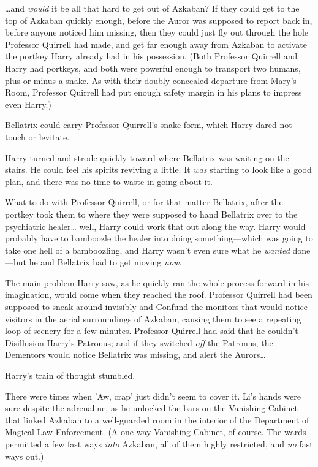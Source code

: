 {\ldots}and \emph{would} it be all that hard to get out of Azkaban? If they 
could get to the top of Azkaban quickly enough, before the Auror was supposed 
to report back in, before anyone noticed him missing, then they could just fly 
out through the hole Professor Quirrell had made, and get far enough away from 
Azkaban to activate the portkey Harry already had in his possession. (Both 
Professor Quirrell and Harry had portkeys, and both were powerful enough to 
transport two humans, plus or minus a snake. As with their doubly-concealed 
departure from Mary's Room, Professor Quirrell had put enough safety margin in 
his plans to impress even Harry.)

Bellatrix could carry Professor Quirrell's snake form, which Harry dared not 
touch or levitate.

Harry turned and strode quickly toward where Bellatrix was waiting on the 
stairs. He could feel his spirits reviving a little. It \emph{was} starting to 
look like a good plan, and there was no time to waste in going about it.

What to do with Professor Quirrell, or for that matter Bellatrix, after the 
portkey took them to where they were supposed to hand Bellatrix over to the 
psychiatric healer{\ldots} well, Harry could work that out along the way. Harry 
would probably have to bamboozle the healer into doing something---which was 
going to take one hell of a bamboozling, and Harry wasn't even sure what he 
\emph{wanted} done---but he and Bellatrix had to get moving \emph{now.}

The main problem Harry saw, as he quickly ran the whole process forward in his 
imagination, would come when they reached the roof. Professor Quirrell had been 
supposed to sneak around invisibly and Confund the monitors that would notice 
visitors in the aerial surroundings of Azkaban, causing them to see a repeating 
loop of scenery for a few minutes. Professor Quirrell had said that he couldn't 
Disillusion Harry's Patronus; and if they switched \emph{off} the Patronus, the 
Dementors would notice Bellatrix was missing, and alert the Aurors{\ldots}

Harry's train of thought stumbled.

There were times when 'Aw, crap' just didn't seem to cover it.
\sbreak
Li's hands were sure despite the adrenaline, as he unlocked the bars on the 
Vanishing Cabinet that linked Azkaban to a well-guarded room in the interior of 
the Department of Magical Law Enforcement. (A one-way Vanishing Cabinet, of 
course. The wards permitted a few fast ways \emph{into} Azkaban, all of them 
highly restricted, and \emph{no} fast ways out.)

